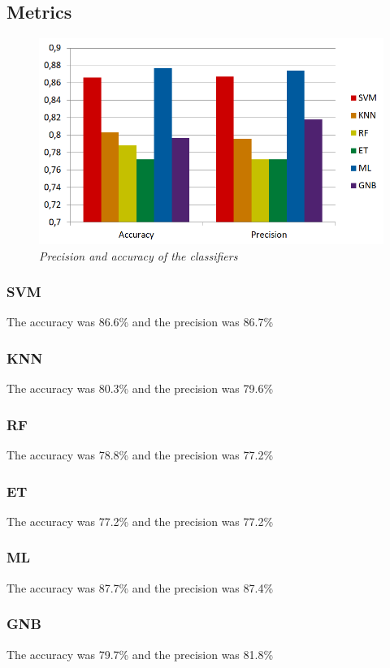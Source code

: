 \documentclass[12pt]{article}
\begin{document}
\subsection{Metrics}
\begin{figure}[!ht]
	\centering %
	\includegraphics[width=1\textwidth]{metrics.png} %
	\caption{\textit{Precision and accuracy of the classifiers}} %
	\label{fig:metrics}
\end{figure}
\subsubsection{SVM}
The accuracy was 86.6\% and the precision was 86.7\%
\subsubsection{KNN}
The accuracy was 80.3\% and the precision was 79.6\%
\subsubsection{RF}
The accuracy was 78.8\% and the precision was 77.2\%
\subsubsection{ET}
The accuracy was 77.2\% and the precision was 77.2\%
\subsubsection{ML}
The accuracy was 87.7\% and the precision was 87.4\%
\subsubsection{GNB}
The accuracy was 79.7\% and the precision was 81.8\%
\end{document}
